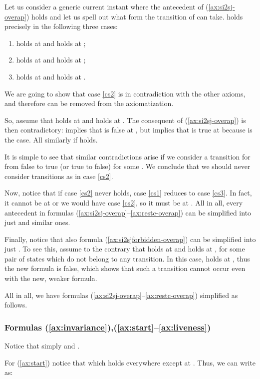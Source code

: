\documentclass[a4paper]{article}
\newcommand{\frf}[1]{(\ref{#1})}
\newcommand{\fsrf}[2]{(\ref{#1}--\ref{#2})}
\theoremstyle{plain}
\theoremstyle{definition}
\begin{document}
Let us consider a generic current instant  where the antecedent of \frf{ax:si2sj-overap} holds and let us spell out what form the transition of  can take.
 holds precisely in the following three cases:
\begin{enumerate}
  \item \label{cs2}  holds at  and  holds at ;
  \item \label{cs1}  holds at  and  holds at ;
  \item \label{cs3}  holds at  and  holds at .
\end{enumerate}
We are going to show that case \ref{cs2} is in contradiction with the other axioms, and therefore can be removed from the axiomatization.

So, assume that  holds at  and  holds at .
The consequent of \frf{ax:si2sj-overap} is then contradictory:  implies that  is false at , but  implies that  is true at  because  is the case.
All similarly if  holds.

It is simple to see that similar contradictions arise if we consider a transition for  from false to true (or true to false) for some .
We conclude that we should never consider transitions as in case \ref{cs2}.

Now, notice that if case \ref{cs2} never holds, case \ref{cs1} reduces to case \ref{cs3}.
In fact, it cannot be  at  or we would have case \ref{cs2}, so it must be  at .
All in all, every antecedent in formulas \fsrf{ax:si2sj-overap}{ax:restc-overap} can be simplified into just  and similar ones.

Finally, notice that also formula \frf{ax:si2sjforbidden-overap} can be simplified into just .
To see this, assume to the contrary that  holds at  and  holds at , for some pair of states  which do not belong to any transition.
In this case,  holds at , thus the new formula is false, which shows that such a transition cannot occur even with the new, weaker formula.

All in all, we have formulas \fsrf{ax:si2sj-overap}{ax:restc-overap} simplified as follows.








\subsubsection{Formulas \frf{ax:invariance},\fsrf{ax:start}{ax:liveness}}
Notice that simply  and .

For \frf{ax:start} notice that  which holds everywhere except at .
Thus, we can write  as:
\end{document}
